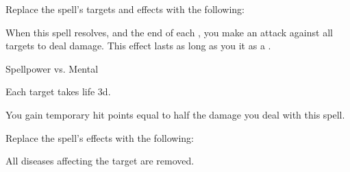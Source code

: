 Replace the spell's targets and effects with the following:
\begin{spellcontent}

\begin{augmenttargetinginfo}




\end{augmenttargetinginfo}


\begin{augmenteffects}



\spelleffect
When this spell resolves, and the end of each , you make an attack against all targets to deal damage.
This effect lasts as long as you  it as a .




\begin{spellattack}{Spellpower vs. Mental}


\spellsuccess
Each target takes life  \minus3d.



\end{spellattack}





\end{augmenteffects}

\end{spellcontent}






You gain temporary hit points equal to half the damage you deal with this spell.









Replace the spell's effects with the following:
\begin{spellcontent}

\begin{augmenteffects}



\spelleffect
All diseases affecting the target are removed.








\end{augmenteffects}

\end{spellcontent}






